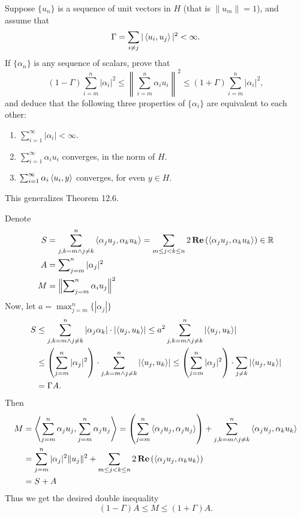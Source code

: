 \begin{enumerate}
\begin{excopy}
Suppose \(\{u_n\}\) is a sequence of unit vectors in $H$
(that is \(\|u_m\| = 1\)), and assume
that
\begin{equation*}
\Gamma = \sum_{i\neq j} |\left\langle u_i,u_j \right\rangle|^2 < \infty.
\end{equation*}
If \(\{\alpha_n\}\) is any sequence of scalars, prove that
\begin{equation*}
 (1 - \Gamma)\sum_{i=m}^n |\alpha_i|^2
 \leq \left\| \sum_{i=m}^n \alpha_i u_i \right\|^2
 \leq (1 + \Gamma) \sum_{i=m}^n |\alpha_i|^2 ,
\end{equation*}
and deduce that the following three properties of \(\{\alpha_i\}\)
are equivalent to each other:
\begin{enumerate}
\item \(\sum_{i=1}^\infty |\alpha_i| < \infty\).
\item \(\sum_{i=1}^\infty \alpha_i u_i\) converges, in the norm of $H$.
\item \(\sum_{i=1}^\infty \alpha_i \left\langle u_i,y \right\rangle\) converges,
  for even \(y\in H\).
\end{enumerate}
This generalizes Theorem 12.6.
\end{excopy}
Denote
\begin{align*}
S &= \sum_{j,k=m \wedge j\neq k}^n \left\langle \alpha_j u_j, \alpha_k u_k \right\rangle
  = \sum_{m\leq j<k\leq n} 2\mathop{\bf Re}\nolimits\left(\left\langle \alpha_j u_j, \alpha_k u_k \right\rangle\right)
  \in \mathbb{R} \\
A &= \sum\nolimits_{j=m}^n |\alpha_j|^2 \\
M &= \left\| \sum\nolimits_{j=m}^n \alpha_i u_j \right\|^2
\end{align*}
Now, let \(a=\max_{j=m}^n\{|\alpha_j|\}\)
\begin{align*}
S
  &\leq \sum_{j,k=m \wedge j\neq k}^n |\alpha_j \alpha_k|\cdot
    \left|\left\langle u_j, u_k \right\rangle\right|
  \leq a^2 \sum_{j,k=m \wedge j\neq k}^n \left|\left\langle u_j, u_k \right\rangle\right| \\
  &\leq  \left(\sum_{j=m}^n |\alpha_j|^2\right)\cdot
        \sum_{j,k=m \wedge j\neq k}^n \left|\left\langle u_j, u_k \right\rangle\right|
  \leq  \left(\sum_{j=m}^n |\alpha_j|^2\right)\cdot
        \sum_{j\neq k} \left|\left\langle u_j, u_k \right\rangle\right| \\
  &= \Gamma A.
\end{align*}
Then
\begin{align*}
M
 &= \left\langle \sum_{j=m}^n \alpha_j u_j, \sum_{j=m}^n \alpha_j u_j \right\rangle
 = \left(\sum_{j=m}^n \left\langle \alpha_j u_j, \alpha_j u_j \right\rangle\right)
   + \sum_{j,k=m \wedge j\neq k}^n \left\langle \alpha_j u_j, \alpha_k u_k \right\rangle \\
 &= \sum_{j=m}^n |\alpha_j|^2\|u_j\|^2
    + \sum_{m\leq j<k\leq n}
      2\mathop{\bf Re}\nolimits\left(\left\langle \alpha_j u_j, \alpha_k u_k \right\rangle\right) \\
 &= S + A
\end{align*}
Thus we get the desired double inequality
\begin{equation*}
(1 - \Gamma)A \leq M \leq (1 + \Gamma)A.
\end{equation*}


\end{enumerate}
